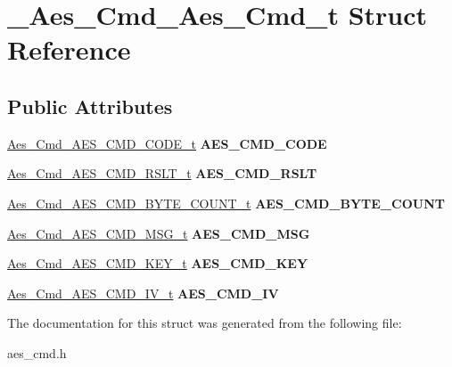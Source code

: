 \hypertarget{struct__Aes__Cmd__Aes__Cmd__t}{\section{\-\_\-\-Aes\-\_\-\-Cmd\-\_\-\-Aes\-\_\-\-Cmd\-\_\-t Struct Reference}
\label{struct__Aes__Cmd__Aes__Cmd__t}
}
\subsection*{Public Attributes}
\begin{DoxyCompactItemize}
\item 
\hypertarget{struct__Aes__Cmd__Aes__Cmd__t_ae8f75e253dc97da46e088c731e69b08f}{\hyperlink{union__Aes__Cmd__AES__CMD__CODE__t}{Aes\-\_\-\-Cmd\-\_\-\-A\-E\-S\-\_\-\-C\-M\-D\-\_\-\-C\-O\-D\-E\-\_\-t} {\bfseries A\-E\-S\-\_\-\-C\-M\-D\-\_\-\-C\-O\-D\-E}}\label{struct__Aes__Cmd__Aes__Cmd__t_ae8f75e253dc97da46e088c731e69b08f}

\item 
\hypertarget{struct__Aes__Cmd__Aes__Cmd__t_aa7f6085e7339a2a3ac8e4a3ac7fcf942}{\hyperlink{union__Aes__Cmd__AES__CMD__RSLT__t}{Aes\-\_\-\-Cmd\-\_\-\-A\-E\-S\-\_\-\-C\-M\-D\-\_\-\-R\-S\-L\-T\-\_\-t} {\bfseries A\-E\-S\-\_\-\-C\-M\-D\-\_\-\-R\-S\-L\-T}}\label{struct__Aes__Cmd__Aes__Cmd__t_aa7f6085e7339a2a3ac8e4a3ac7fcf942}

\item 
\hypertarget{struct__Aes__Cmd__Aes__Cmd__t_a249fa35fcaa68917a0716a9936130d43}{\hyperlink{union__Aes__Cmd__AES__CMD__BYTE__COUNT__t}{Aes\-\_\-\-Cmd\-\_\-\-A\-E\-S\-\_\-\-C\-M\-D\-\_\-\-B\-Y\-T\-E\-\_\-\-C\-O\-U\-N\-T\-\_\-t} {\bfseries A\-E\-S\-\_\-\-C\-M\-D\-\_\-\-B\-Y\-T\-E\-\_\-\-C\-O\-U\-N\-T}}\label{struct__Aes__Cmd__Aes__Cmd__t_a249fa35fcaa68917a0716a9936130d43}

\item 
\hypertarget{struct__Aes__Cmd__Aes__Cmd__t_a3ba9ef18ad93eb1883578e5c929af65e}{\hyperlink{union__Aes__Cmd__AES__CMD__MSG__t}{Aes\-\_\-\-Cmd\-\_\-\-A\-E\-S\-\_\-\-C\-M\-D\-\_\-\-M\-S\-G\-\_\-t} {\bfseries A\-E\-S\-\_\-\-C\-M\-D\-\_\-\-M\-S\-G}}\label{struct__Aes__Cmd__Aes__Cmd__t_a3ba9ef18ad93eb1883578e5c929af65e}

\item 
\hypertarget{struct__Aes__Cmd__Aes__Cmd__t_aa0539a628a736b8de0d3e31407539f61}{\hyperlink{union__Aes__Cmd__AES__CMD__KEY__t}{Aes\-\_\-\-Cmd\-\_\-\-A\-E\-S\-\_\-\-C\-M\-D\-\_\-\-K\-E\-Y\-\_\-t} {\bfseries A\-E\-S\-\_\-\-C\-M\-D\-\_\-\-K\-E\-Y}}\label{struct__Aes__Cmd__Aes__Cmd__t_aa0539a628a736b8de0d3e31407539f61}

\item 
\hypertarget{struct__Aes__Cmd__Aes__Cmd__t_aaabe0791fd5bc294da8c1044218cb86f}{\hyperlink{union__Aes__Cmd__AES__CMD__IV__t}{Aes\-\_\-\-Cmd\-\_\-\-A\-E\-S\-\_\-\-C\-M\-D\-\_\-\-I\-V\-\_\-t} {\bfseries A\-E\-S\-\_\-\-C\-M\-D\-\_\-\-I\-V}}\label{struct__Aes__Cmd__Aes__Cmd__t_aaabe0791fd5bc294da8c1044218cb86f}

\end{DoxyCompactItemize}


The documentation for this struct was generated from the following file\-:\begin{DoxyCompactItemize}
\item 
aes\-\_\-cmd.\-h\end{DoxyCompactItemize}

